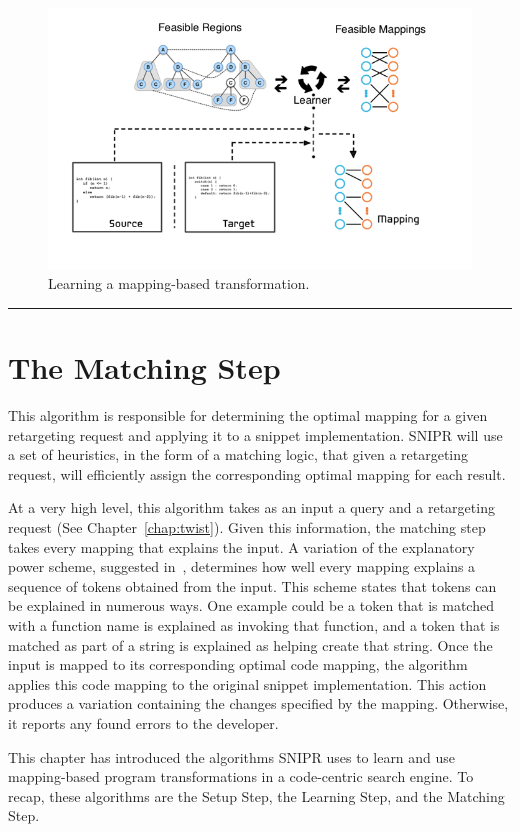 \begin{figure}[!ht]
    \centering
    \includegraphics[width=\textwidth]{images/mappinggeneration}
    \caption{Learning a mapping-based transformation.}
    \label{fig:mappinggeneration}
\end{figure}

\fancybreak{\pfbreakdisplay}

\section{The Matching Step}
\label{sec:matching}

This algorithm is responsible for determining the optimal mapping for a given retargeting request and applying it to a snippet implementation. \uppercase{SNIPR} will use a set of heuristics, in the form of a matching logic, that given a retargeting request, will efficiently assign the corresponding optimal mapping for each result. 

At a very high level, this algorithm takes as an input a query and a retargeting request (See Chapter~\ref{chap:twist}). Given this information, the matching step takes every mapping that explains the input. A variation of the explanatory power scheme, suggested in~\cite{Little:2008hr}, determines how well every mapping explains a sequence of tokens obtained from the input. This scheme states that tokens can be explained in numerous ways. One example could be a token that is matched with a function name is explained as invoking that function, and a token that is matched as part of a string is explained as helping create that string. Once the input is mapped to its corresponding optimal code mapping, the algorithm applies this code mapping to the original snippet implementation. This action produces a variation containing the changes specified by the mapping. Otherwise, it reports any found errors to the developer. 

This chapter has introduced the algorithms SNIPR uses to learn and use mapping-based program transformations in a code-centric search engine. To recap, these algorithms are the Setup Step, the Learning Step, and the Matching Step.
